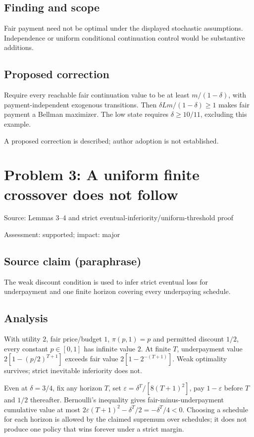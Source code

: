 \documentclass[11pt]{article}
\begin{document}
\subsection*{Finding and scope}

Fair payment need not be optimal under the displayed stochastic assumptions. Independence or uniform conditional continuation control would be substantive additions.

\subsection*{Proposed correction}

Require every reachable fair continuation value to be at least \(m/(1-\delta)\), with payment-independent exogenous transitions. Then \(\delta Lm/(1-\delta)\ge1\) makes fair payment a Bellman maximizer. The low state requires \(\delta\ge10/11\), excluding this example.

A proposed correction is described; author adoption is not established.

\section*{Problem 3: A uniform finite crossover does not follow}

Source: Lemmas 3–4 and strict eventual-inferiority/uniform-threshold proof

Assessment: supported; impact: major

\subsection*{Source claim (paraphrase)}

The weak discount condition is used to infer strict eventual loss for underpayment and one finite horizon covering every underpaying schedule.

\subsection*{Analysis}

With utility \(2\), fair price/budget \(1\), \(\pi(p,1)=p\) and permitted discount \(1/2\), every constant \(p\in[0,1]\) has infinite value \(2\). At finite \(T\), underpayment value \(2[1-(p/2)^{T+1}]\) exceeds fair value \(2[1-2^{-(T+1)}]\). Weak optimality survives; strict inevitable inferiority does not.

Even at \(\delta=3/4\), fix any horizon \(T\), set \(\varepsilon=\delta^T/[8(T+1)^2]\), pay \(1-\varepsilon\) before \(T\) and \(1/2\) thereafter. Bernoulli’s inequality gives fair-minus-underpayment cumulative value at most \(2\varepsilon(T+1)^2-\delta^T/2=-\delta^T/4<0\). Choosing a schedule for each horizon is allowed by the claimed supremum over schedules; it does not produce one policy that wins forever under a strict margin.
\end{document}

